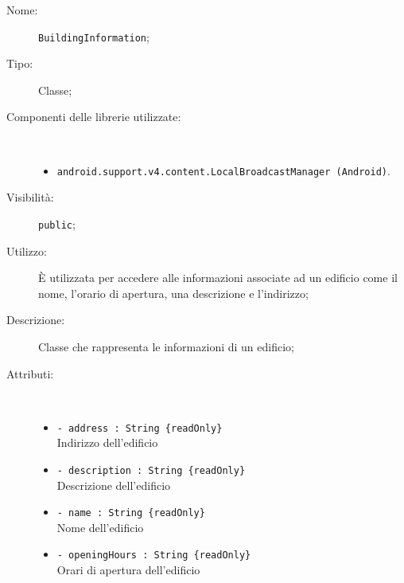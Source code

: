 \documentclass[../DefinizioneDiProdotto.tex]{subfiles}
\begin{document}
\begin{description}
	\item[Nome:] \texttt{BuildingInformation};
	\item[Tipo:] Classe;
	\item[Componenti delle librerie utilizzate:] \
	\begin{itemize}
		\item \texttt{android.support.v4.content.LocalBroadcastManager (Android)}.
		
	\end{itemize}
	\item[Visibilità:] \texttt{public};
	\item[Utilizzo:] È utilizzata per accedere alle informazioni associate ad un edificio come il nome, l'orario di apertura, una descrizione e l'indirizzo;
	\item[Descrizione:] Classe che rappresenta le informazioni di un edificio;
	\item[Attributi:] \
	\begin{itemize}
		\item \texttt{- address : String  \{readOnly\}}\\
		Indirizzo dell'edificio
		
		\item \texttt{- description : String  \{readOnly\}}\\
		Descrizione dell'edificio
		
		\item \texttt{- name : String  \{readOnly\}}\\
		Nome dell'edificio
		
		\item \texttt{- openingHours : String  \{readOnly\}}\\
		Orari di apertura dell'edificio
		

\end{itemize}
\end{description}
\end{document}
